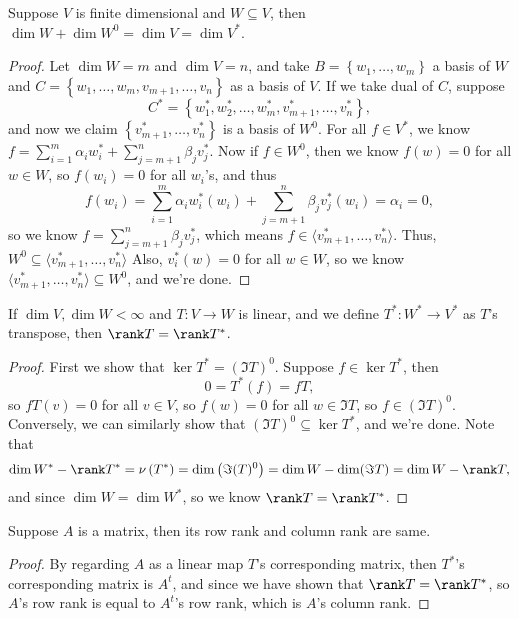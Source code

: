 \begin{proposition}
    Suppose \(V\) is finite dimensional and \(W \subseteq V\), then \(\dim W + \dim W^0 = \dim V = \dim V^*\).  
\end{proposition}
\begin{proof}
    Let \(\dim W = m\) and \(\dim V = n\), and take \(B = \left\{ w_1, \dots , w_m \right\} \) a basis of \(W\) and \(C = \left\{ w_1, \dots , w_m, v_{m+1}, \dots ,v_n \right\} \) as a basis of \(V\). If we take dual of \(C\), suppose 
    \[
        C^* = \left\{ w_1^*, w_2^*, \dots , w_m^*, v_{m+1}^*, \dots , v_n^* \right\},
    \] and now we claim \(\left\{ v_{m+1}^*, \dots , v_n^* \right\} \) is a basis of \(W^0\). For all \(f \in V^*\), we know \(f = \sum_{i=1}^m \alpha _i w_i^* + \sum_{j=m+1}^n \beta _j v_j^*  \). Now if \(f \in W^0\), then we know \(f(w) = 0\) for all \(w \in W\), so \(f(w_i) = 0\) for all \(w_i\)'s, and thus 
    \[
        f(w_i) =  \sum_{i=1}^m \alpha _i w_i^*(w_i) + \sum_{j=m+1}^n \beta _j v_j^*(w_i) = \alpha _i = 0,
    \] so we know \(f = \sum_{j=m+1}^n \beta _j v_j^*\), which means \(f \in \langle v_{m+1}^*, \dots , v_n^* \rangle \). Thus, \(W^0 \subseteq \langle v_{m+1}^*, \dots , v_n^* \rangle\)  Also, \(v_i^*(w) = 0\) for all \(w \in W\), so we know \(\langle v_{m+1}^*, \dots , v_n^* \rangle \subseteq W^0 \), and we're done.      
\end{proof}

\begin{corollary}
    If \(\dim V, \dim W < \infty \) and \(T: V \to W\) is linear, and we define \(T^* : W^* \to V^*\) as \(T\)'s transpose, then \(\rank T = \rank T^*\).  
\end{corollary}
\begin{proof}
    First we show that \(\ker T^* = (\Im T)^0\). Suppose \(f \in \ker T^*\), then 
    \[
        0 = T^*(f) = fT,
    \] so \(fT(v) = 0\) for all \(v \in V\), so \(f(w) = 0\) for all \(w \in \Im T\), so \(f \in \left( \Im T \right)^0 \). Conversely, we can similarly show that \((\Im T)^0 \subseteq \ker T^*\), and we're done. Note that 
    \[
        \dim W^* - \rank T^* = \nu \left( T^* \right) = \dim \left( \Im (T)^0 \right) = \dim W - \dim (\Im T) = \dim W - \rank T,
    \] and since \(\dim W = \dim W^*\), so we know \(\rank T = \rank T^*\).  
\end{proof}

\begin{corollary}
    Suppose \(A\) is a matrix, then its row rank and column rank are same. 
\end{corollary}
\begin{proof}
    By regarding \(A\) as a linear map \(T\)'s corresponding matrix, then  \(T^*\)'s corresponding matrix is \(A^t\), and since we have shown that \(\rank T = \rank T^*\), so \(A\)'s row rank is equal to \(A^t\)'s row rank, which is \(A\)'s column rank.       
\end{proof}

